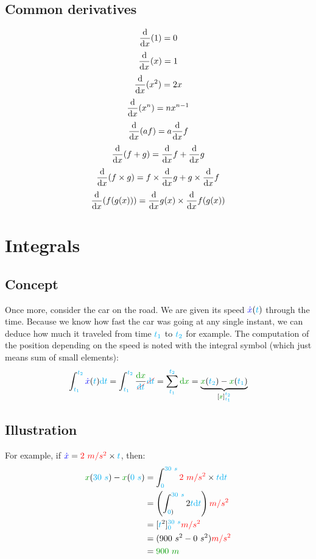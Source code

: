 \subsection{Common derivatives}

\[
\frac {\mathrm{d}} {\mathrm{d} x} (1)   = 0
\]
\[
\frac {\mathrm{d}} {\mathrm{d} x} (x)   = 1
\]
\[
\frac {\mathrm{d}} {\mathrm{d} x} (x^2) = 2x
\]
\[
\frac {\mathrm{d}} {\mathrm{d} x} (x^n) = n x^{n-1}
\]
\[
\frac {\mathrm{d}} {\mathrm{d} x} (a f)
= a \frac {\mathrm{d}} {\mathrm{d} x} f
\]
\[
\frac {\mathrm{d}} {\mathrm{d} x} (f + g)
= \frac {\mathrm{d}} {\mathrm{d} x} f
+ \frac {\mathrm{d}} {\mathrm{d} x} g
\]
\[
\frac {\mathrm{d}} {\mathrm{d} x} (f \times g)
= f \times \frac {\mathrm{d}} {\mathrm{d} x} g
+ g \times \frac {\mathrm{d}} {\mathrm{d} x} f
\]
\[
\frac {\mathrm{d}} {\mathrm{d} x} (f(g(x)))
= \frac {\mathrm{d}} {\mathrm{d} x} g(x)
\times \frac {\mathrm{d}} {\mathrm{d} x} f(g(x))
\]



\section{Integrals}


\subsection{Concept}

Once more, consider the car on the road. We are given its speed
$\textcolor{blue}{\dot x}(\textcolor{cyan}{t})$ through the time. Because we know how fast the
car was going at any single instant, we can deduce how much it traveled
from time $\textcolor{cyan}{t_1}$ to $\textcolor{cyan}{t_2}$ for example. The computation
of the position depending on the speed is
noted with the integral symbol (which just means sum of small elements):
\[
\int_{\delay{t_1}}^{\delay{t_2}} \speed{\dot x}(\delay{t}) \delay{\dt}
= \int_{\delay{t_1}}^{\delay{t_2}} \frac {\dist{\d x}} {\strike[red]{\delay{\dt}}} \strike[red]{\delay{\dt}}
= \sum_{\delay{t_1}}^{\delay{t_2}} \dist{\d x}
= \underbrace{
	\dist{x}(\delay{t_2}) - \dist{x}(\delay{t_1})
}_{[\dist{x}]_{\delay{t_1}}^{\delay{t_2}}}
\]


\subsection{Illustration}

For example, if $\textcolor{blue}{\dot x} = \textcolor{red}{2~m/s^2} \times \textcolor{cyan}{t}$, then:
\begin{align*}
\dist{x}(\delay{30~s}) - \dist{x}(\delay{0~s})
&= \int_{\delay{0}}^{\delay{30~s}} \accel{2~m/s^2} \times \delay{t} \delay{\dt} \\
&= \left(\int_{\delay{0})}^{\delay{30~s}} 2 \delay{t} \delay{\dt}\right) \accel{m/s^2} \\
&= [\delay{t}^2]_{\delay{0}}^{\delay{30~s}} \accel{m/s^2} \\
&= (900~s^2 - 0~s^2) \accel{m/s^2} \\
&= \dist{900~m}
\end{align*}

